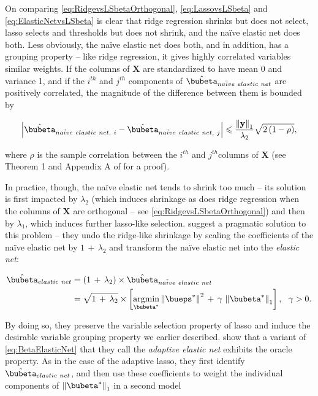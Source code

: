 \documentclass[graybox,envcountchap,sectrefs]{svmono}\usepackage[]{graphicx}\usepackage[]{xcolor}
\begin{document}
\begin{appendices}
On comparing \eqref{eq:RidgevsLSbetaOrthogonal}, \eqref{eq:LassovsLSbeta}
and \eqref{eq:ElasticNetvsLSbeta} is clear that ridge regression
shrinks but does not select, lasso selects and thresholds but does
not shrink, and the na\"{i}ve elastic net does both. Less obviously,
the na\"{i}ve elastic net does both, and in addition, has a grouping
property -- like ridge regression, it gives highly correlated variables
similar weights. If the columns of $\mathbf{X}$ are standardized
to have mean 0 and variance 1, and if the $i^{th}$ and $j^{th}$
components of $\hat{\bubeta}_{na\ddot{i}ve\ elastic\ net}$ are positively
correlated, the magnitude of the difference between them is bounded
by 

\begin{equation}
\left|\hat{\bubeta}_{na\ddot{i}ve\ elastic\ net,\ i}-\hat{\bubeta}_{na\ddot{i}ve\ elastic\ net,\ j}\right|\leqslant\frac{\left\Vert \mathbf{y}\right\Vert _{1}}{\lambda_{2}}\sqrt{2\,(1-\rho)},\label{eq:DeltaBetaBound}
\end{equation}

where $\rho$ is the sample correlation between the $i^{th}$ and
$j^{th}$columns of $\mathbf{X}$ (see Theorem 1 and Appendix A of
\citet{ZouHastie2005} for a proof). 

In practice, though, the na\"{i}ve elastic net tends to shrink too
much -- its solution is first impacted by $\lambda_{2}$ (which induces
shrinkage as does ridge regression when the columns of $\mathbf{X}$
are orthogonal -- see \eqref{eq:RidgevsLSbetaOrthogonal}) and then
by $\lambda_{1}$, which induces further lasso-like selection. \citet{ZouHastie2005}
suggest a pragmatic solution to this problem -- they undo the ridge-like
shrinkage by scaling the coefficients of the na\"{i}ve elastic net
by $1\,+\,\lambda_{2}$ and transform the na\"{i}ve elastic net into
the \emph{elastic net}:

\begin{align}
\hat{\bubeta}_{elastic\ net} & =\left(1\,+\,\lambda_{2}\right)\times\hat{\bubeta}_{na\ddot{i}ve\ elastic\ net}\nonumber \\
 & =\sqrt{1\,+\,\lambda_{2}}\times\left[\underset{\bubeta^{*}}{\mathrm{argmin}}\left\Vert \bueps^{*}\right\Vert ^{2}\,+\,\gamma\,\left\Vert \bubeta^{*}\right\Vert _{1}\right],\ \ \gamma>0.\label{eq:BetaElasticNet}
\end{align}

By doing so, they preserve the variable selection property of lasso
and induce the desirable variable grouping property we earlier described.
\citet{ZouZhang2009} show that a variant of \eqref{eq:BetaElasticNet}
that they call the \emph{adaptive elastic net} exhibits the oracle
property. As in the case of the adaptive lasso, they first identify
$\hat{\bubeta}_{elastic\ net}$, and then use these coefficients to
weight the individual components of $\left\Vert \bubeta^{*}\right\Vert _{1}$
in a second model


\end{appendices}
\end{document}
